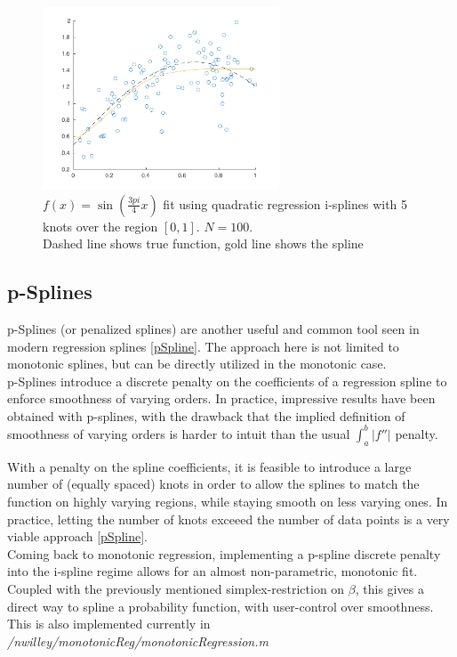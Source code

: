 \documentclass{article}
\begin{document}
	\begin{figure}[h]
		\centering
		\includegraphics[width=7cm]{sinFit.pdf}
		\caption{$f(x) = \sin(\frac{3pi}{4}x)$ fit using quadratic regression i-splines with 5 knots over the region $[0,1]$. $N=100$. \\ Dashed line shows true function, gold line shows the spline}
	\end{figure}
	
	\subsection{p-Splines}
	
	p-Splines (or penalized splines) are another useful and common tool seen in modern regression splines \ref{pSpline}. The approach here is not limited to monotonic splines, but can be directly utilized in the monotonic case. \\
	p-Splines introduce a discrete penalty on the coefficients of a regression spline to enforce smoothness of varying orders. In practice, impressive results have been obtained with p-splines, with the drawback that the implied definition of smoothness of varying orders is harder to intuit than the usual $\int_a^b |f''|$ penalty.
	
	With a penalty on the spline coefficients, it is feasible to introduce a large number of (equally spaced) knots in order to allow the splines to match the function on highly varying regions, while staying smooth on less varying ones. In practice, letting the number of knots exceeed the number of data points is a very viable approach \ref{pSpline}. \\
	
	Coming back to monotonic regression, implementing a p-spline discrete penalty into the i-spline regime allows for an almost non-parametric, monotonic fit. Coupled with the previously mentioned simplex-restriction on $\beta$, this gives a direct way to spline a probability function, with user-control over smoothness. This is also implemented currently in \textit{/nwilley/monotonicReg/monotonicRegression.m}
	
\end{document}
